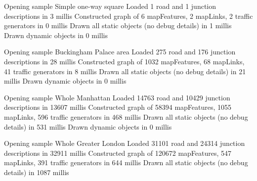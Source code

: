 Opening sample Simple one-way square
Loaded 1 road and 1 junction descriptions in 3 millis
Constructed graph of 6 mapFeatures, 2 mapLinks, 2 traffic generators in 0 millis
Drawn all static objects (no debug details) in 1 millis
Drawn dynamic objects in 0 millis

Opening sample Buckingham Palace area
Loaded 275 road and 176 junction descriptions in 28 millis
Constructed graph of 1032 mapFeatures, 68 mapLinks, 41 traffic generators in 8 millis
Drawn all static objects (no debug details) in 21 millis
Drawn dynamic objects in 0 millis

Opening sample Whole Manhattan
Loaded 14763 road and 10429 junction descriptions in 13607 millis
Constructed graph of 58394 mapFeatures, 1055 mapLinks, 596 traffic generators in 468 millis
Drawn all static objects (no debug details) in 531 millis
Drawn dynamic objects in 0 millis

Opening sample Whole Greater London
Loaded 31101 road and 24314 junction descriptions in 32911 millis
Constructed graph of 120672 mapFeatures, 547 mapLinks, 391 traffic generators in 644 millis
Drawn all static objects (no debug details) in 1087 millis


